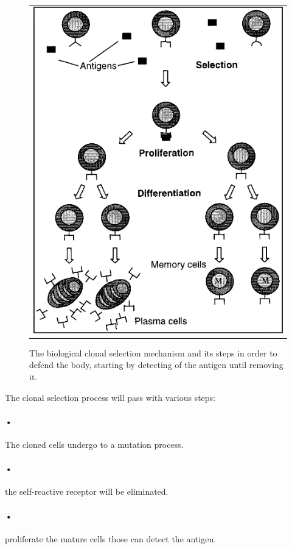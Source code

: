 \documentclass[conference]{IEEEtran}
\begin{document}
\begin{figure}
\begin{tabular}{c}
\includegraphics[scale = 0.8]{clonaS}
\end{tabular}
\caption{The biological clonal selection mechanism and its steps in order to defend the body, starting by detecting of the antigen until removing it.}
\end{figure}

The clonal selection process will pass with various steps\cite{doc7}:
\paragraph{•}
The cloned cells undergo to a mutation process.
\paragraph{•}
the self-reactive receptor will be eliminated.
\paragraph{•}
proliferate the mature cells those can detect the antigen.
\end{document}
